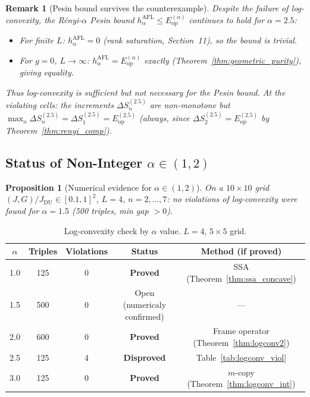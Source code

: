 \documentclass[12pt,a4paper]{article}
\newtheorem{proposition}[theorem]{Proposition}
\newtheorem{remark}[theorem]{Remark}
\begin{document}
\begin{remark}[Pesin bound survives the counterexample]
Despite the failure of log-convexity, the Rényi-$\alpha$ Pesin bound
$h_\alpha^{\mathrm{AFL}}\leq E_{\mathrm{op}}^{(\alpha)}$ continues to hold for $\alpha=2.5$:
\begin{itemize}
\item For finite $L$: $h_\alpha^{\mathrm{AFL}}=0$ (rank saturation, Section~11), so the bound is trivial.
\item For $g=0$, $L\to\infty$: $h_\alpha^{\mathrm{AFL}}=E_{\mathrm{op}}^{(\alpha)}$ exactly
  (Theorem~\ref{thm:geometric_purity}), giving equality.
\end{itemize}
Thus log-convexity is \emph{sufficient} but \emph{not necessary} for the Pesin bound.
At the violating cells: the increments $\Delta S_n^{(2.5)}$ are non-monotone
but $\max_n\Delta S_n^{(2.5)}=\Delta S_1^{(2.5)}=E_{\mathrm{op}}^{(2.5)}$ (always, since
$\Delta S_2^{(2.5)}=E_{\mathrm{op}}^{(2.5)}$ by Theorem~\ref{thm:renyi_comp}).
\end{remark}

\subsection{Status of Non-Integer $\alpha\in(1,2)$}
\label{sec:logconv_12}

\begin{proposition}[Numerical evidence for $\alpha\in(1,2)$]
\label{prop:logconv_15}
On a $10\times10$ grid $(J,G)/J_\mathrm{DU}\in[0.1,1]^2$, $L=4$, $n=2,\ldots,7$:
no violations of log-convexity were found for $\alpha=1.5$ (500 triples, min gap $>0$).
\end{proposition}

\begin{table}[h!]
\centering
\caption{Log-convexity check by $\alpha$ value. $L=4$, $5\times5$ grid.}
\label{tab:logconv_summary}
\begin{tabular}{c|c|c|c|c}
$\alpha$ & Triples & Violations & Status & Method (if proved)\\
\hline
1.0 & 125 & 0 & {\bf Proved} & SSA (Theorem~\ref{thm:ssa_concave})\\
1.5 & 500 & 0 & Open (numericaly confirmed) & ---\\
2.0 & 600 & 0 & {\bf Proved} & Frame operator (Theorem~\ref{thm:logconv2})\\
2.5 & 125 & 4 & {\bf Disproved} & Table~\ref{tab:logconv_viol}\\
3.0 & 125 & 0 & {\bf Proved} & $m$-copy (Theorem~\ref{thm:logconv_int})\\
\end{tabular}
\end{table}
\end{document}
